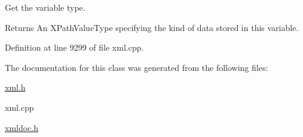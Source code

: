 Get the variable type. 

\begin{DoxyReturn}{Returns}
An XPathValueType specifying the kind of data stored in this variable. 
\end{DoxyReturn}


Definition at line 9299 of file xml.cpp.



The documentation for this class was generated from the following files:\begin{DoxyCompactItemize}
\item 
\hyperlink{xml_8h}{xml.h}\item 
xml.cpp\item 
\hyperlink{xmldoc_8h}{xmldoc.h}\end{DoxyCompactItemize}
